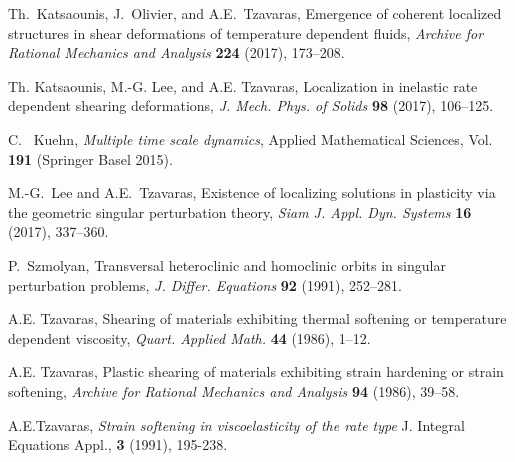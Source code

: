 \documentclass[a4paper,11pt]{article}
\theoremstyle{remark}
\begin{document}
\begin{thebibliography}{10}
{\sc Th.~Katsaounis, J.~Olivier, and A.E.~Tzavaras},
Emergence of coherent localized structures in shear deformations of temperature dependent fluids,
{\it Archive for Rational Mechanics and Analysis} {\bf 224} (2017), 173--208.


{\sc Th. Katsaounis, M.-G. Lee, and A.E. Tzavaras},
Localization in inelastic rate dependent shearing deformations,
{\it J. Mech. Phys. of Solids} {\bf 98} (2017), 106--125.

{\sc C.~ Kuehn},
{\it Multiple time scale dynamics}, Applied Mathematical Sciences, Vol. {\bf 191} (Springer Basel 2015).

{\sc M.-G.~Lee and A.E.~Tzavaras},
Existence of localizing solutions in plasticity via the geometric singular perturbation theory,
{\it Siam J. Appl. Dyn. Systems} {\bf 16} (2017), 337--360.



{\sc P.~Szmolyan},
Transversal heteroclinic and homoclinic orbits in singular perturbation problems,
{\it J. Differ. Equations}
{\bf 92} (1991), 252--281.

{\sc A.E. Tzavaras},
Shearing of materials exhibiting thermal softening or temperature dependent viscosity,
{\em Quart.  Applied Math.} {\bf 44} (1986), 1--12.


{\sc A.E. Tzavaras},
Plastic shearing of materials exhibiting strain hardening or strain softening,
{\it Archive for Rational Mechanics and  Analysis}
{\bf 94} (1986), 39--58.


{\sc A.E.Tzavaras},
{\sl Strain softening in viscoelasticity of the rate type}
J. Integral Equations Appl., {\bf 3} (1991), 195-238.





%
%
%
%
%
%
%
%
%

\end{thebibliography}
\end{document}
